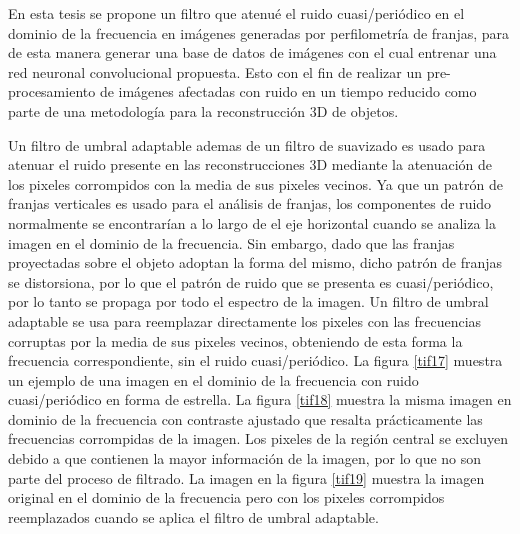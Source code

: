 \documentclass[10pt,letterpaper]{article}
\begin{document}
En esta tesis se propone un filtro que atenué el ruido cuasi/periódico en el dominio de la frecuencia en imágenes generadas por perfilometría de franjas, para de esta manera generar una base de datos de imágenes con el cual entrenar una red neuronal convolucional propuesta. Esto con el fin de realizar un pre-procesamiento de imágenes afectadas con ruido en un tiempo reducido como parte de una metodología para la reconstrucción 3D de objetos.

Un filtro de umbral adaptable ademas de un filtro de suavizado es usado para atenuar el ruido presente en las reconstrucciones 3D mediante la atenuación de los pixeles corrompidos con la media de sus pixeles vecinos. Ya que un patrón de franjas verticales es usado para el análisis de franjas, los componentes de ruido normalmente se encontrarían a lo largo de el eje horizontal cuando se analiza la imagen en el dominio de la frecuencia. Sin embargo, dado que las franjas proyectadas sobre el objeto adoptan la forma del mismo, dicho patrón de franjas se distorsiona, por lo que el patrón de ruido que se presenta es cuasi/periódico, por lo tanto se propaga por todo el espectro de la imagen. Un filtro de umbral adaptable se usa para reemplazar directamente los pixeles con las frecuencias corruptas por la media de sus pixeles vecinos, obteniendo de esta forma la frecuencia correspondiente, sin el ruido cuasi/periódico. La figura \ref{tif17} muestra un ejemplo de una imagen en el dominio de la frecuencia con ruido cuasi/periódico en forma de estrella. La figura \ref{tif18} muestra la misma imagen en dominio de la frecuencia con contraste ajustado que resalta prácticamente las frecuencias corrompidas de la imagen. Los pixeles de la región central se excluyen debido a que contienen la mayor información de la imagen, por lo que no son parte del proceso de filtrado. La imagen en la figura \ref{tif19} muestra la imagen original en el dominio de la frecuencia pero con los pixeles corrompidos reemplazados cuando se aplica el filtro de umbral adaptable.
\end{document}
